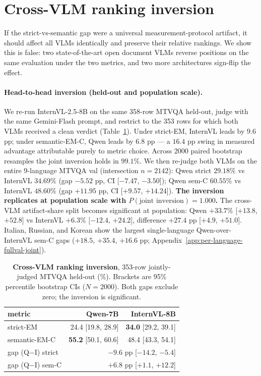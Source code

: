 \section{Cross-VLM ranking inversion}
\label{sec:inversion}

If the strict-vs-semantic gap were a universal measurement-protocol artifact, it should affect all VLMs identically and preserve their relative rankings. We show this is false: two state-of-the-art open document VLMs reverse positions on the same evaluation under the two metrics, and two more architectures sign-flip the effect.

\paragraph{Head-to-head inversion (held-out and population scale).}
We re-run InternVL-2.5-8B on the same 358-row MTVQA held-out, judge with the same Gemini-Flash prompt, and restrict to the 353 rows for which both VLMs received a clean verdict (Table~\ref{tab:vlm-inversion}). Under strict-EM, InternVL leads by $9.6$ pp; under semantic-EM-C, Qwen leads by $6.8$ pp --- a $16.4$ pp swing in measured advantage attributable purely to metric choice. Across 2000 paired bootstrap resamples the joint inversion holds in $99.1\%$. We then re-judge both VLMs on the entire 9-language MTVQA val (intersection $n=2142$): Qwen strict $29.18\%$ vs InternVL $34.69\%$ (gap $-5.52$ pp, CI [$-7.47$, $-3.50$]); Qwen sem-C $60.55\%$ vs InternVL $48.60\%$ (gap $+11.95$ pp, CI [$+9.57$, $+14.24$]). \textbf{The inversion replicates at population scale with $P(\text{joint inversion}) = 1.000$.} The cross-VLM artifact-share split becomes significant at population: Qwen $+33.7\%$ [$+13.8$, $+52.8$] vs InternVL $+6.3\%$ [$-12.4$, $+24.2$], difference $+27.4$ pp [$+4.9$, $+51.0$]. Italian, Russian, and Korean show the largest single-language Qwen-over-InternVL sem-C gaps ($+18.5$, $+35.4$, $+16.6$ pp; Appendix~\ref{app:per-language-fullval-joint}).

\begin{table}[t]
\centering
\small
\begin{tabular}{lrr}
\toprule
metric & Qwen-7B & InternVL-8B \\
\midrule
strict-EM     & 24.4 \footnotesize{[19.8, 28.9]} & \textbf{34.0} \footnotesize{[29.2, 39.1]} \\
semantic-EM-C & \textbf{55.2} \footnotesize{[50.1, 60.6]} & 48.4 \footnotesize{[43.3, 54.1]} \\
\midrule
gap (Q$-$I) strict & \multicolumn{2}{r}{$-9.6$ pp \footnotesize{[$-14.2$, $-5.4$]}} \\
gap (Q$-$I) sem-C  & \multicolumn{2}{r}{$+6.8$ pp \footnotesize{[$+1.1$, $+12.2$]}} \\
\bottomrule
\end{tabular}
\caption{\textbf{Cross-VLM ranking inversion}, 353-row jointly-judged MTVQA held-out (\%). Brackets are 95\% percentile bootstrap CIs ($N=2000$). Both gaps exclude zero; the inversion is significant.}
\label{tab:vlm-inversion}
\end{table}

